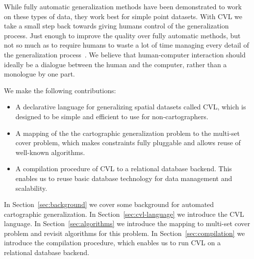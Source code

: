 While fully automatic generalization methods have been demonstrated to work on these types of data, they work best for simple point datasets. With CVL we take a small step back towards giving humans control of the generalization process. Just enough to improve the quality over fully automatic methods, but not so much as to require humans to waste a lot of time managing every detail of the generalization process~\cite{fme}. We believe that human-computer interaction should ideally be a dialogue between the human and the computer, rather than a monologue by one part.

We make the following contributions:

\begin{itemize}
\item A declarative language for generalizing spatial datasets called CVL, which is designed to be simple and efficient to use for non-cartographers. 
\item A mapping of the the cartographic generalization problem to the multi-set cover problem, which makes constraints fully pluggable and allows reuse of well-known algorithms.
\item A compilation procedure of CVL to a relational database backend. This enables us to reuse basic database technology for data management and scalability.
\end{itemize}

In Section~\ref{sec:background} we cover some background for automated cartographic generalization. In Section~\ref{sec:cvl-language} we introduce the CVL language. In Section~\ref{sec:algorithms} we introduce the mapping to multi-set cover problem and revisit algorithms for this problem. In Section~\ref{sec:compilation} we introduce the compilation procedure, which enables us to run CVL on a relational database backend.